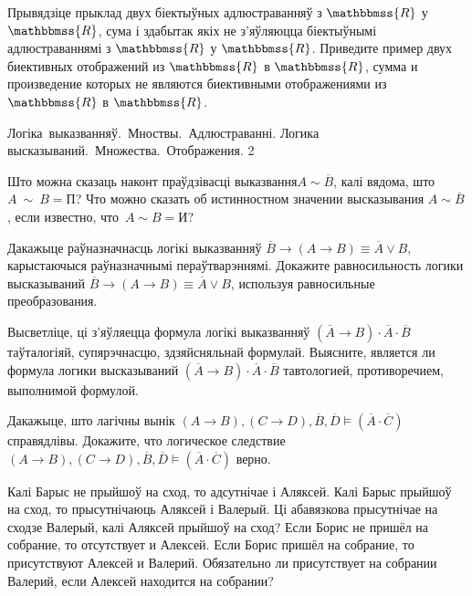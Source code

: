 \documentclass[12pt, a4paper]{article}
\begin{document}
\begin{problemList}
\bigskip

\problemItemSimple
{Прывядзіце прыклад двух біектыўных адлюстраванняў з $\mathbbmss{R}$ у $\mathbbmss{R}$,
сума і здабытак якіх не з'яўляюцца біектыўнымі адлюстраваннямі з $\mathbbmss{R}$ у $\mathbbmss{R}$.}
{Приведите пример двух биективных отображений из $\mathbbmss{R}$ в $\mathbbmss{R}$,
сумма и произведение которых не являются биективными отображениями из $\mathbbmss{R}$ в $\mathbbmss{R}$.}

\end{problemList}

\newpage

\quizTitle
{Логіка~выказванняў.~Мноствы.~Адлюстраванні.}
{Логика высказываний.~Множества.~Отображения.}
{2}

\begin{problemList}

\problemItemSimple
{Што можна сказаць наконт праўдзівасці выказвання$A \sim \overline{B}$, калі вядома, што~$A~\sim~B = \mbox{П}$?}
{Что можно сказать об истинностном значении высказывания $A \sim \overline{B}$, если известно, что~$A \sim B = \mbox{И}$?}

\bigskip

\problemItemSimple
{Дакажыце раўназначнасць логікі выказванняў $\overline{B} \to (A \to B) \equiv \overline{A} \vee B$,
карыстаючыся раўназначнымі пераўтварэннямі.}
{Докажите равносильность логики высказываний $\overline{B} \to (A \to B) \equiv \overline{A} \vee B$,
используя равносильные преобразования.}

\bigskip

\problemItemSimple
{Высветліце, ці з'яўляецца формула логікі выказванняў $(\overline{A} \to B) \cdot \overline{A} \cdot \overline{B}$
таўталогіяй, супярэчнасцю, здзяйсняльнай формулай.}
{Выясните, является ли формула логики высказываний $(\overline{A} \to B) \cdot \overline{A} \cdot \overline{B}$
тавтологией, противоречием, выполнимой формулой.}

\bigskip

\problemItemSimple
{Дакажыце, што лагічны вынік $(A \to B), (C \to D), \overline{B}, \overline{D} \models (\overline{A} \cdot \overline{C})$ справядлівы.}
{Докажите, что логическое следствие $(A \to B), (C \to D), \overline{B}, \overline{D} \models (\overline{A} \cdot \overline{C})$ верно.}

\bigskip

\problemItemSimple
{Калі Барыс не прыйшоў на сход, то адсутнічае і Аляксей. Калі Барыс прыйшоў на сход, то прысутнічаюць Аляксей і Валерый.
Ці абавязкова прысутнічае на сходзе Валерый, калі Аляксей прыйшоў на сход?}
{Если Борис не пришёл на собрание, то отсутствует и Алексей. Если Борис пришёл на собрание, то присутствуют Алексей и Валерий.
Обязательно ли присутствует на собрании Валерий, если Алексей находится на собрании?}


\end{problemList}
\end{document}
